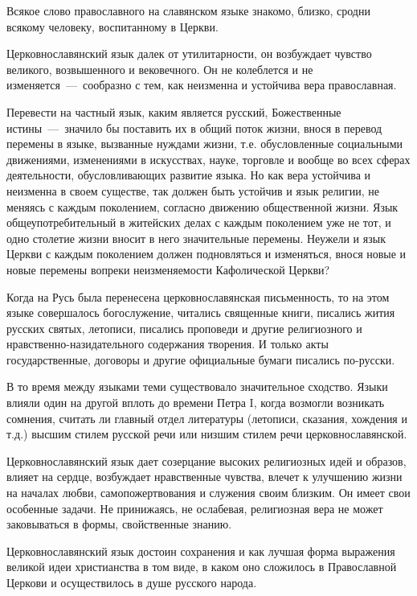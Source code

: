 \documentclass[11pt,a4paper,oneside]{memoir}
\begin{document}
    Всякое слово православного на славянском языке знакомо, близко, сродни всякому человеку, воспитанному в Церкви.
    
    Церковнославянский язык далек от утилитарности, он возбуждает чувство великого, возвышенного и вековечного. Он не колеблется и не изменяется~---~сообразно с тем, как неизменна и устойчива вера православная.
    
    Перевести на частный язык, каким является русский, Божественные истины~---~значило бы поставить их в общий поток жизни, внося в перевод перемены в языке, вызванные нуждами жизни, т.е. обусловленные социальными движениями, изменениями в искусствах, науке, торговле и вообще во всех сферах деятельности, обусловливающих развитие языка. Но как вера устойчива и неизменна в своем существе, так должен быть устойчив и язык религии, не меняясь с каждым поколением, согласно движению общественной жизни. Язык общеупотребительный в житейских делах с каждым поколением уже не тот, и одно столетие жизни вносит в него значительные перемены. Неужели и язык Церкви с каждым поколением должен подновляться и изменяться, внося новые и новые перемены вопреки неизменяемости Кафолической Церкви?
    
    Когда на Русь была перенесена церковнославянская письменность, то на этом языке совершалось богослужение, читались священные книги, писались жития русских святых, летописи, писались проповеди и другие религиозного и нравственно-назидательного содержания творения. И только акты государственные, договоры и другие официальные бумаги писались по-русски.
    
    В то время между языками теми существовало значительное сходство. Языки влияли один на другой вплоть до времени Петра I, когда возмогли возникать сомнения, считать ли главный отдел литературы (летописи, сказания, хождения и т.д.) высшим стилем русской речи или низшим стилем речи церковнославянской.
    
    Церковнославянский язык дает созерцание высоких религиозных идей и образов, влияет на сердце, возбуждает нравственные чувства, влечет к улучшению жизни на началах любви, самопожертвования и служения своим близким. Он имеет свои особенные задачи. Не принижаясь, не ослабевая, религиозная вера не может заковываться в формы, свойственные знанию.
    
    Церковнославянский язык достоин сохранения и как лучшая форма выражения великой идеи христианства в том виде, в каком оно сложилось в Православной Церкови и осуществилось в душе русского народа.
    
\end{document}
